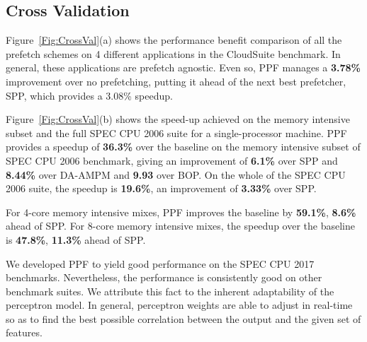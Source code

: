 \subsection{Cross Validation}
\label{Results-CrossVal}

%
%

Figure~\ref{Fig:CrossVal}(a) shows the performance benefit comparison of all
the prefetch schemes on 4 different applications in the CloudSuite benchmark.
In general, these applications are prefetch agnostic. Even so, PPF manages a
\textbf{3.78\%} improvement over no prefetching, putting it ahead of the next
best prefetcher, SPP, which provides a 3.08\% speedup.

Figure~\ref{Fig:CrossVal}(b) shows the speed-up achieved 
on the memory intensive subset and the full SPEC CPU 2006 suite for a
single-processor machine. 
PPF provides a speedup of \textbf{36.3\%} over the baseline on the 
memory intensive subset of SPEC CPU
2006 benchmark, giving an improvement of \textbf{6.1\%} over SPP and
\textbf{8.44\%} over DA-AMPM and \textbf{9.93} over BOP. On the whole of 
the SPEC CPU 2006 suite, the speedup is \textbf{19.6\%}, an improvement 
of \textbf{3.33\%} over SPP.

For 4-core memory intensive mixes, PPF improves the baseline by
\textbf{59.1\%}, \textbf{8.6\%} ahead of SPP. For 8-core memory intensive
mixes, the speedup over the baseline is \textbf{47.8\%}, \textbf{11.3\%} ahead
of SPP.

We developed PPF to yield good performance on the SPEC CPU 2017 benchmarks.
Nevertheless, the performance is consistently good on other benchmark suites.
We attribute this fact to the inherent adaptability of the perceptron model.
In general, perceptron weights are able to adjust in real-time so as to find
the best possible correlation between the output and the given set of
features.
